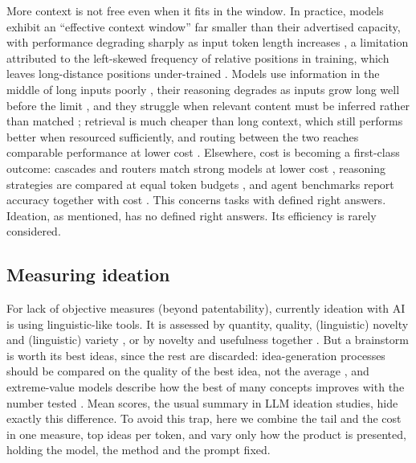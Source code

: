 More context is not free even when it fits in the window. In practice, models exhibit an ``effective context window'' far smaller than their advertised capacity, with performance degrading sharply as input token length increases \citep{Paulsen2026}, a limitation attributed to the left-skewed frequency of relative positions in training, which leaves long-distance positions under-trained \citep{An2024}. Models use information in the middle of long inputs poorly \citep{Liu2024}, their reasoning degrades as inputs grow long well before the limit \citep{Levy2024}, and they struggle when relevant content must be inferred rather than matched \citep{Modarressi2025}; retrieval is much cheaper than long context, which still performs better when resourced sufficiently, and routing between the two reaches comparable performance at lower cost \citep{Li2024}. Elsewhere, cost is becoming a first-class outcome: cascades and routers match strong models at lower cost \citep{Chen2024d,Ong2024,Ding2024}, reasoning strategies are compared at equal token budgets \citep{Wang2024,Han2025}, and agent benchmarks report accuracy together with cost \citep{Kapoor2025,Wang2025}. This  concerns tasks with defined right answers. Ideation, as mentioned, has no defined right answers. Its efficiency is  rarely considered.

\subsection{Measuring ideation}

For lack of objective measures (beyond patentability), currently ideation with AI is using linguistic-like tools. It is assessed by quantity, quality, (linguistic) novelty and (linguistic) variety \citep{Shah2003}, or by novelty and usefulness together \citep{Sarkar2011}. But a brainstorm is worth its best ideas, since the rest are discarded: idea-generation processes should be compared on the quality of the best idea, not the average \citep{Girotra2010}, and extreme-value models describe how the best of many concepts improves with the number tested \citep{Dahan2001}. Mean scores, the usual summary in LLM ideation studies, hide exactly this difference. To avoid this trap, here we combine the tail and the cost in one measure, top ideas per token, and vary only how the product is presented, holding the model, the method and the prompt fixed.


